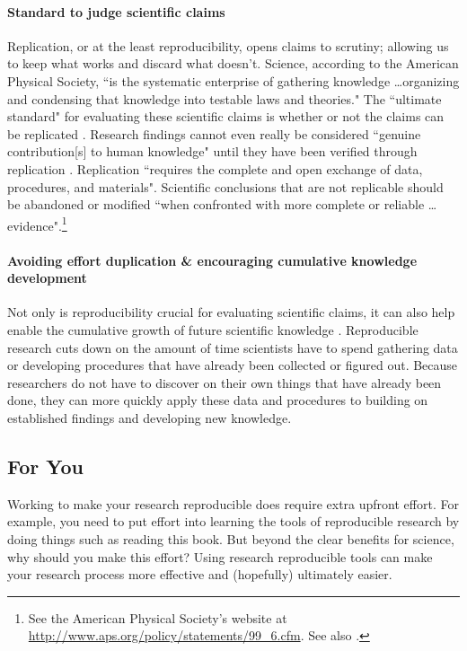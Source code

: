 \paragraph{Standard to judge scientific claims} 
Replication, or at the least reproducibility, opens claims to scrutiny; allowing us to keep what works and discard what doesn't. Science, according to the American Physical Society, ``is the systematic enterprise of gathering knowledge \ldots organizing and condensing that knowledge into testable laws and theories." The ``ultimate standard" for evaluating these scientific claims is whether or not the claims can be replicated \cite[]{Peng2011,Kelly2006}. Research findings cannot even really be considered ``genuine contribution[s] to human knowledge" until they have been verified through replication \cite[38]{Stodden2009}. Replication ``requires the complete and open exchange of data, procedures, and materials". Scientific conclusions that are not replicable should be abandoned or modified ``when confronted with more complete or reliable \ldots evidence".\footnote{See the American Physical Society's website at \url{http://www.aps.org/policy/statements/99_6.cfm}. See also \cite{Fomel2009}.} 

\paragraph{Avoiding effort duplication \& encouraging cumulative knowledge development} 
Not only is reproducibility crucial for evaluating scientific claims, it can also help enable the cumulative growth of future scientific knowledge \cite[]{Kelly2006,King1995}. Reproducible research cuts down on the amount of time scientists have to spend gathering data or developing procedures that have already been collected or figured out. Because researchers do not have to discover on their own things that have already been done, they can more quickly apply these data and procedures to building on established findings and developing new knowledge.

\subsection{For You}

Working to make your research reproducible does require extra upfront effort. For example, you need to put effort into learning the tools of reproducible research by doing things such as reading this book. But beyond the clear benefits for science, why should you make this effort? Using research reproducible tools can make your research process more effective and (hopefully) ultimately easier.

